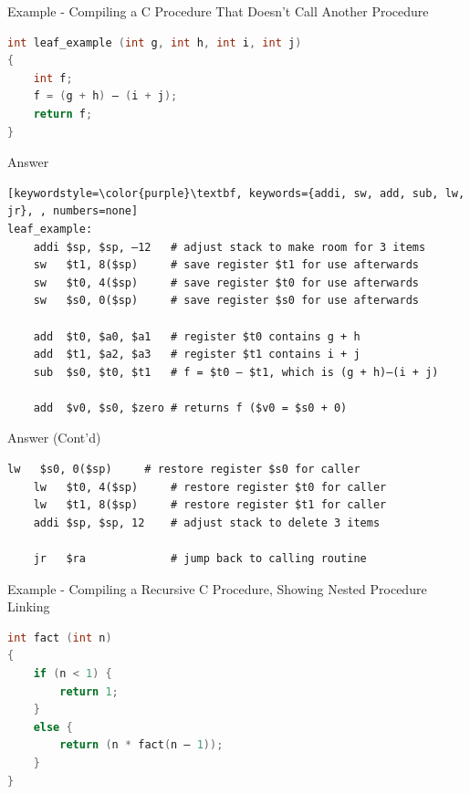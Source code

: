 \begin{frame}[fragile]{Example - Compiling a C Procedure That Doesn’t Call Another Procedure}
\begin{lstlisting}[language=c, keywordstyle=\color{purple}\textbf]
int leaf_example (int g, int h, int i, int j)
{
    int f;
    f = (g + h) – (i + j);
    return f;
}
\end{lstlisting}
\end{frame}

\begin{frame}[fragile]{Answer}
\begin{lstlisting}[keywordstyle=\color{purple}\textbf, keywords={addi, sw, add, sub, lw, jr}, , numbers=none]
leaf_example:
    addi $sp, $sp, –12   # adjust stack to make room for 3 items
    sw   $t1, 8($sp)     # save register $t1 for use afterwards
    sw   $t0, 4($sp)     # save register $t0 for use afterwards
    sw   $s0, 0($sp)     # save register $s0 for use afterwards
    
    add  $t0, $a0, $a1   # register $t0 contains g + h
    add  $t1, $a2, $a3   # register $t1 contains i + j
    sub  $s0, $t0, $t1   # f = $t0 – $t1, which is (g + h)–(i + j)
    
    add  $v0, $s0, $zero # returns f ($v0 = $s0 + 0)    
\end{lstlisting}
\end{frame}

\begin{frame}[fragile]{Answer (Cont'd)}
\begin{lstlisting}[keywordstyle=\color{purple}\textbf, keywords={addi, sw, add, sub, lw, jr}, numbers=none]
    lw   $s0, 0($sp)     # restore register $s0 for caller
    lw   $t0, 4($sp)     # restore register $t0 for caller
    lw   $t1, 8($sp)     # restore register $t1 for caller
    addi $sp, $sp, 12    # adjust stack to delete 3 items

    jr   $ra             # jump back to calling routine 
\end{lstlisting}
\end{frame}

\begin{frame}[fragile]{Example - Compiling a Recursive C Procedure, Showing Nested Procedure
        Linking}
\begin{lstlisting}[keywordstyle=\color{purple}\textbf, language=c]
int fact (int n)
{
    if (n < 1) {
        return 1;
    }
    else {
        return (n * fact(n – 1));
    }
}
\end{lstlisting}
\end{frame}


